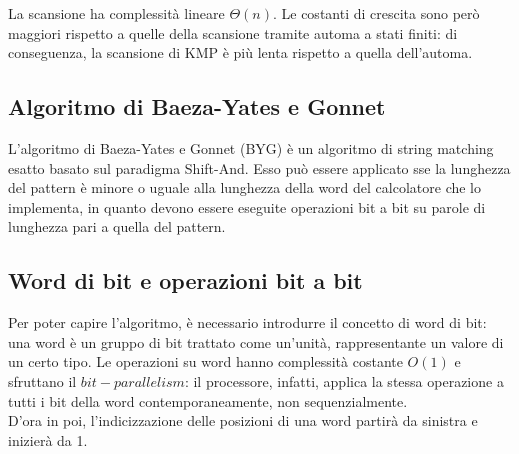 La scansione ha complessità lineare $\Theta(n)$. Le costanti di crescita sono però maggiori rispetto a quelle della scansione tramite automa a stati finiti: di conseguenza, la scansione di KMP è più lenta rispetto a quella dell'automa.



\subsection{Algoritmo di Baeza-Yates e Gonnet}
L'algoritmo di Baeza-Yates e Gonnet (BYG) è un algoritmo di string matching esatto basato sul paradigma Shift-And.
Esso può essere applicato sse la lunghezza del pattern è minore o uguale alla lunghezza della word del calcolatore che lo implementa, in quanto devono essere eseguite operazioni bit a bit su parole di lunghezza pari a quella del pattern.

\subsection*{Word di bit e operazioni bit a bit}
Per poter capire l'algoritmo, è necessario introdurre il concetto di word di bit: una word è un gruppo di bit trattato come un'unità, rappresentante un valore di un certo tipo.
Le operazioni su word hanno complessità costante $O(1)$ e sfruttano il $bit-parallelism$: il processore, infatti, applica la stessa operazione a tutti i bit della word contemporaneamente, non sequenzialmente.\\
D'ora in poi, l'indicizzazione delle posizioni di una word partirà da sinistra e inizierà da 1.

